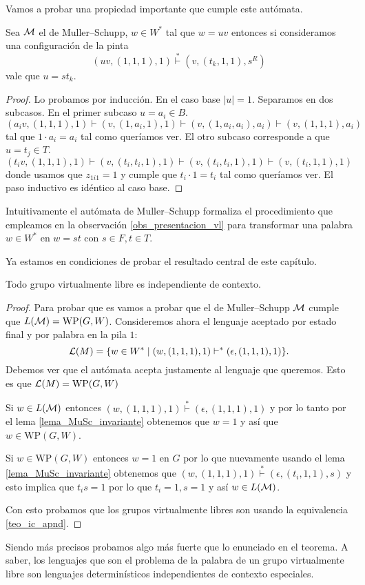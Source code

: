 \documentclass[tesis.tex]{subfiles}
\begin{document}
	Vamos a probar una propiedad importante que cumple este autómata.
	\begin{lema}\label{lema_MuSc_invariante}
	Sea $\cal M$ el \APD de Muller--Schupp, $w \in W^*$ tal que $ w = uv $ entonces si consideramos una configuración de la pinta
		\[
			(uv,(1,1,1), 1) \overset{*}{\vdash} (v, (t_{k},1,1), s^R)
		\]
		vale que $u = st_{k}$.
	\end{lema}
	
	\begin{proof}
		Lo probamos por inducción.
		En el caso base $|u| = 1$.
		Separamos en dos subcasos. 
		En el primer subcaso $u = a_{i} \in B$.
		\[
		(a_{i}v, ( 1,1,1), 1 ) \vdash (v, (1,a_{i},1),1) \vdash (v,(1,a_{i},a_{i}),a_{i}) \vdash (v, (1,1,1), a_{i})
		\]
		tal que $1 \cdot a_{i} = a_{i}$ tal como queríamos ver.
		El otro subcaso corresponde a que $u = t_{j} \in T$.
		\[
		(t_{i}v, (1,1,1), 1) \vdash (v, (t_{i},t_{i},1),1) \vdash (v,(t_{i},t_{i},1),1) \vdash (v, (t_{i},1,1), 1)
		\]
		donde usamos que $z_{1i1} = 1$ y cumple que $t_{i} \cdot 1 = t_{i}$ tal como queríamos ver.
		El paso inductivo es idéntico al caso base.
	\end{proof}
	
	
	Intuitivamente el autómata de Muller--Schupp formaliza el procedimiento que empleamos en la observación \ref{obs_presentacion_vl} para transformar una palabra $w \in W^*$ en $w = st$ con $s \in F, t \in T$.
	
	Ya estamos en condiciones de probar el resultado central de este capítulo.

\begin{teo}\label{teo_Muller_Schupp}\cite{muller1983groups}
	Todo grupo virtualmente libre es independiente de contexto.
\end{teo}

\begin{proof}
	Para probar que es \ic vamos a probar que el \APD de Muller--Schupp $\cal M$ cumple que $L({\cal M})= \text{WP}(G,W)$.
	Consideremos ahora el lenguaje aceptado por estado final y por palabra en la pila $1$:
	\[
	{\cal L }(M) = \{  w \in W^* \mid (w,(1,1,1),1)   \vdash^*  (\epsilon, (1,1,1), 1)  \}.
	\]
	Debemos ver que el autómata acepta justamente al lenguaje que queremos. 
	Esto es que $ {\cal L }(M) = \text{WP}(G,W) $ 
	
	Si $w \in L(\cal M)$ entonces $(w, (1,1,1), 1) \overset{*}{\vdash} (\epsilon, (1,1,1), 1)$ y por lo tanto por el lema \ref{lema_MuSc_invariante} obtenemos que $w = 1$ y así que $w \in \text{WP}(G,W)$.
	
	Si $w \in \text{WP}(G,W)$ entonces $w = 1$ en $G$ por lo que nuevamente usando el lema \ref{lema_MuSc_invariante} obtenemos que $(w, (1,1,1), 1) \overset{*}{\vdash} (\epsilon, (t_{i},1,1), s)$
	y esto implica que $t_{i}s = 1$ por lo que $t_{i} = 1, s =1$ y así $w \in L(\cal M)$.
	
	
	Con esto probamos que los grupos virtualmente libres son \ic usando la equivalencia \ref{teo_ic_apnd}.
	
\end{proof}

Siendo más precisos probamos algo más fuerte que lo enunciado en el teorema.
A saber, los lenguajes que son el problema de la palabra de un grupo virtualmente libre son lenguajes determinísticos independientes de contexto especiales.
\end{document}
